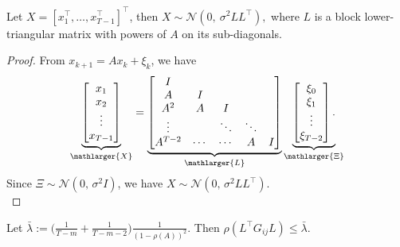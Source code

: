 \documentclass[11pt]{article}
\begin{document}
\begin{lemma}
\label{lem:traj_distribution}
Let $X=[x_1^\top,\dots,x_{T-1}^\top]^\top$, then
\(
X\sim \mathcal{N}(0,\ \sigma^2 L L^\top),
\)
where $L$ is a block lower-triangular matrix with powers of $A$ on its sub-diagonals.
\end{lemma}

\begin{proof}
\noindent From $x_{k+1} = A x_k + \xi_k$, we have 
\begin{align*}
    \underbrace{\begin{bmatrix}
        x_1 \\ x_2 \\  \vdots \\ x_{T-1} 
    \end{bmatrix} }_{\mathlarger{X}} =
    \underbrace{\begin{bmatrix}  
    I \\    
    A & I \\
    A^2 & A & I \\
    \vdots & &  \ddots & \ddots\\
    A^{T-2} & \cdots & \cdots & A & I
    \end{bmatrix}}_{\mathlarger{L}}
    \underbrace{\begin{bmatrix}
        \xi_0 \\ \xi_1 \\  \vdots \\ \xi_{T-2} 
    \end{bmatrix}. }_{\mathlarger{\Xi}}
\end{align*}
Since $\Xi \sim \mathcal{N}(0,\, \sigma^2 I)$, we have $X \sim \mathcal{N}(0,\, \sigma^2 LL^\top )$. \\
\end{proof}


\begin{lemma}
\label{lem:spectral_bound}
Let $\bar{\lambda} := \big(\frac{1}{T-m}+\frac{1}{T-m-2}\big)\frac{1}{(1-\rho(A))^2}$. Then
\(
\rho(L^\top G_{ij}L)\le \bar{\lambda}.
\)
\end{lemma}
\end{document}
